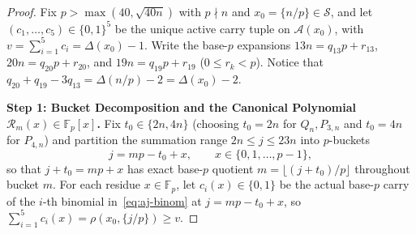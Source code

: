 \documentclass[11pt,reqno]{amsart}
\theoremstyle{definition}
\theoremstyle{remark}
\newcommand{\FF}{\mathbb{F}}
\begin{document}
\begin{proof}
Fix $p > \max(40, \sqrt{40n})$ with $p \nmid n$ and $x_0 = \{n/p\} \in \mathcal{S}$, and let $(c_1, \ldots, c_5) \in \{0,1\}^5$ be the unique active carry tuple on $\mathcal{A}(x_0)$, with $v = \sum_{i=1}^5 c_i = \Delta(x_0) - 1$. Write the base-$p$ expansions $13n = q_{13}p + r_{13}$, $20n = q_{20}p + r_{20}$, and $19n = q_{19}p + r_{19}$ ($0 \le r_k < p$). Notice that $q_{20} + q_{19} - 3q_{13} = \Delta(n/p) - 2 = \Delta(x_0) - 2$.

\medskip
\noindent\textbf{Step 1: Bucket Decomposition and the Canonical Polynomial $\mathcal{R}_m(x) \in \FF_p[x]$.}
Fix $t_0 \in \{2n, 4n\}$ (choosing $t_0 = 2n$ for $Q_n, P_{3,n}$ and $t_0 = 4n$ for $P_{4,n}$) and partition the summation range $2n \le j \le 23n$ into $p$-buckets
\[
  j = m p - t_0 + x, \qquad x \in \{0, 1, \ldots, p - 1\},
\]
so that $j + t_0 = m p + x$ has exact base-$p$ quotient $m = \lfloor (j + t_0)/p \rfloor$ throughout bucket $m$. For each residue $x \in \FF_p$, let $c_i(x) \in \{0, 1\}$ be the actual base-$p$ carry of the $i$-th binomial in~\eqref{eq:aj-binom} at $j = mp - t_0 + x$, so $\sum_{i=1}^5 c_i(x) = \rho(x_0, \{j/p\}) \ge v$.


\end{proof}
\end{document}
